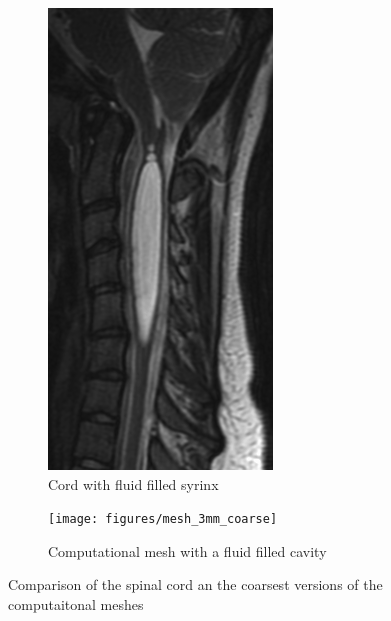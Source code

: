 \begin{figure}[!h]
\begin{subfigure}[b]{0.5\linewidth}
\begin{center}
\includegraphics[width=0.7\linewidth]{figures/Syrinx_Subject}
\caption{Cord with fluid filled syrinx}
\end{center}
\end{subfigure}
\begin{subfigure}[b]{0.5\linewidth}
\begin{center}
\texttt{[image: figures/mesh\_3mm\_coarse]}
\caption{Computational mesh with a fluid filled cavity}
\end{center}
\end{subfigure}
\caption{Comparison of the spinal cord an the coarsest versions of the computaitonal meshes}
\end{figure}

